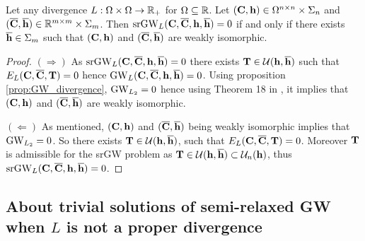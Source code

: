 \begin{lemma}\label{lemma:srgw_divergence}
	Let any divergence $L: \Omega \times \Omega \rightarrow \mathbb{R}_+$ for $\Omega \subseteq \mathbb{R}$. Let $({\mathbf{C}}, {\mathbf{h}}) \in \Omega^{n \times n} \times \Sigma_n$  and $(\overline{{\mathbf{C}}}, \overline{{\mathbf{h}}}) \in \mathbb{R}^{m \times m} \times \Sigma_m$. Then $\operatorname{srGW}_L({\mathbf{C}}, \overline{{\mathbf{C}}}, {\mathbf{h}}, \overline{{\mathbf{h}}}) = 0$ if and only if there exists $\overline{{\mathbf{h}}} \in \Sigma_m$ such that $({\mathbf{C}}, {\mathbf{h}})$ and $(\overline{{\mathbf{C}}}, \overline{{\mathbf{h}}})$ are weakly isomorphic.
\end{lemma}
\begin{proof}
	$(\Rightarrow)$ As $\operatorname{srGW}_L({\mathbf{C}}, \overline{{\mathbf{C}}}, {\mathbf{h}}, \overline{{\mathbf{h}}}) = 0$ there exists ${\mathbf{T}} \in \mathcal{U}({\mathbf{h}}, \overline{{\mathbf{h}}})$ such that $E_L({\mathbf{C}}, \overline{{\mathbf{C}}}, {\mathbf{T}}) = 0$ hence $\operatorname{GW}_L({\mathbf{C}}, \overline{{\mathbf{C}}}, {\mathbf{h}}, \overline{{\mathbf{h}}}) = 0$. Using proposition \ref{prop:GW_divergence}, $\operatorname{GW}_{L_2}=0$ hence using Theorem 18 in \citep{chowdhury2019gromov}, it implies that $({\mathbf{C}}, {\mathbf{h}})$ and $(\overline{{\mathbf{C}}}, \overline{{\mathbf{h}}})$ are weakly isomorphic.
	
	$(\Leftarrow)$ As mentioned, $({\mathbf{C}}, {\mathbf{h}})$ and $(\overline{{\mathbf{C}}}, \overline{{\mathbf{h}}})$ being weakly isomorphic implies that $\operatorname{GW}_{L_2}=0$. So there exists ${\mathbf{T}} \in \mathcal{U}({\mathbf{h}}, \overline{{\mathbf{h}}})$, such that $E_L({\mathbf{C}}, \overline{{\mathbf{C}}}, {\mathbf{T}}) = 0$. Moreover ${\mathbf{T}}$ is admissible for the srGW problem as ${\mathbf{T}} \in \mathcal{U}({\mathbf{h}}, \overline{{\mathbf{h}}}) \subset \mathcal{U}_n({\mathbf{h}})$, thus $\operatorname{srGW}_L({\mathbf{C}}, \overline{{\mathbf{C}}}, {\mathbf{h}}, \overline{{\mathbf{h}}}) = 0$.
\end{proof}

\subsection{About trivial solutions of semi-relaxed GW when $L$ is not a proper divergence}

